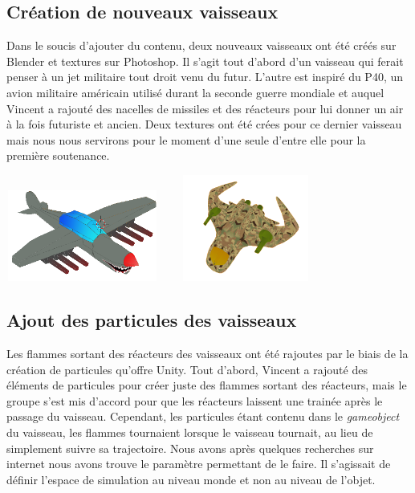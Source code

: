 \documentclass[10pt, titlepage]{report}
\begin{document}
\subsection{Création de nouveaux vaisseaux}
Dans le soucis d'ajouter du contenu, deux nouveaux vaisseaux ont été créés sur Blender et textures sur Photoshop. Il s'agit tout d'abord d'un vaisseau qui ferait penser à un jet militaire tout droit venu du futur. L'autre est inspiré du P40, un avion militaire américain utilisé durant la seconde guerre mondiale et auquel Vincent a rajouté des nacelles de missiles et des réacteurs pour lui donner un air à la fois futuriste et ancien. Deux textures ont été crées pour ce dernier vaisseau mais nous nous servirons pour le moment d'une seule d'entre elle pour la première soutenance.\\

\begin{center}
\includegraphics[height=3cm, width=5cm]{sharknado.png}
\includegraphics[height=3.5cm, width=5.5cm]{vaisseaumilitaire.png}
\end{center}


\subsection{Ajout des particules des vaisseaux}
Les flammes sortant des réacteurs des vaisseaux ont été rajoutes par le biais de la création de particules qu'offre Unity. Tout d'abord, Vincent a rajouté des éléments de particules pour créer juste des flammes sortant des réacteurs, mais le groupe s'est mis d'accord pour que les réacteurs laissent une trainée après le passage du vaisseau. Cependant, les particules étant contenu dans le \textit{gameobject} du vaisseau, les flammes tournaient lorsque le vaisseau tournait, au lieu de simplement suivre sa trajectoire. Nous avons après quelques recherches sur internet nous avons trouve le paramètre permettant de le faire. Il s'agissait de définir l'espace de simulation au niveau monde et non au niveau de l'objet.\\
\end{document}
